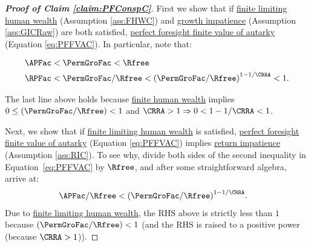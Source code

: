 \documentclass[\econtexRoot/BufferStockTheory]{subfiles}
\begin{document}
\begin{proof}[\textbf{Proof of Claim \ref{claim:PFConspC}}]
First we show that if \hyperlink{FHWC}{finite limiting human wealth} (Assumption \ref{ass:FHWC}) and \hyperlink{GIC}{growth impatience} (Assumption \ref{ass:GICRaw}) are both satisfied, \hyperlink{PFFVAC}{perfect foresight finite value of autarky} (Equation \eqref{eq:PFFVAC}).
In particular, note that:
  
\begin{equation}\label{eq:GICandFHWCimplyPFFVAC}
  \begin{split}
    \APFac & < \PermGroFac < \Rfree
    \\   \RPFac & < \PermGroFac/\Rfree < {(\PermGroFac/\Rfree)}^{1-1/\CRRA} < 1.
  \end{split}
\end{equation}

The last line above holds because \hyperlink{FHWC}{finite human wealth} implies $0 \leq (\PermGroFac/\Rfree) < 1$ and $\CRRA > 1 \Rightarrow 0 < 1-1/\CRRA < 1$.


Next, we show that if \hyperlink{FHWC}{finite limiting human wealth} is satisfied, \hyperlink{PFFVAC}{perfect foresight finite value of autarky} (Equation \eqref{eq:PFFVAC}) implies \hyperlink{RIC}{return impatience} (Assumption \ref{ass:RIC}).
To see why, divide both sides of the second inequality in Equation~\eqref{eq:PFFVAC} by $\Rfree$, and after some straightforward algebra, arrive at:
%
  \begin{align}
    \APFac/\Rfree & < {(\PermGroFac/\Rfree)}^{1-1/\CRRA}  \label{eq:FHWCandPFFVACimplyRIC}.
  \end{align}
  Due to \hyperlink{FHWC}{finite limiting human wealth}, the RHS above is strictly less than $ 1$ because $(\PermGroFac/\Rfree) < 1$ (and the RHS is raised to a positive power (because $\CRRA>1$)).

\end{proof}
%
\begin{comment}
The first panel of Table~\ref{table:Required} summarizes: The PF-Unconstrained model has a non-degenerate limiting solution if we impose the {\RIC} and {\FHWC} (these conditions are necessary as well as sufficient).
Together the {\PFFVAC} and the {\FHWC} imply the {\RIC}.
If we impose the {\GICRaw} and the {\FHWC}, both the {\PFFVAC} and the {\RIC} follow, so {\GICRaw}+{\FHWC} are also sufficient.
But there are circumstances under which the {\RIC} and {\FHWC} can hold while the {\PFFVAC} fails (`\cncl{\PFFVAC}').
For example, if $\PermGroFac=0$, the problem is a standard `cake-eating' problem with a non-degenerate solution under the {\RIC} (when the consumer has access to capital markets).%
\end{comment}
\end{document}
